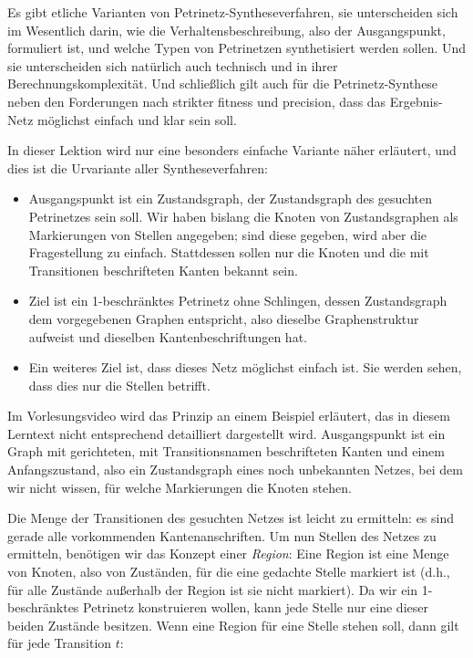 Es gibt etliche Varianten von Petrinetz-Syntheseverfahren, sie unterscheiden sich im Wesentlich darin, wie die Verhaltensbeschreibung, also der Ausgangspunkt, formuliert ist, und welche Typen von Petrinetzen synthetisiert werden sollen. Und sie unterscheiden sich natürlich auch technisch und in ihrer Berechnungskomplexität. Und schließlich gilt auch für die Petrinetz-Synthese neben den Forderungen nach strikter fitness und precision, dass das Ergebnis-Netz möglichst einfach und klar sein soll. 

In dieser Lektion wird nur eine besonders einfache Variante näher erläutert, und dies ist die Urvariante aller Syntheseverfahren: 

\vspace{2mm} %

\begin{itemize}
	\item Ausgangspunkt ist ein Zustandsgraph, der Zustandsgraph des gesuchten Petri\-netzes sein soll. Wir haben bislang die Knoten von Zustandsgraphen als Markierungen von Stellen angegeben; sind diese gegeben, wird aber die Fragestellung zu einfach. Stattdessen sollen nur die Knoten und die mit Transitionen beschrifteten Kanten bekannt sein.
	\item Ziel ist ein 1-beschränktes Petrinetz ohne Schlingen, dessen Zustandsgraph dem vorgegebenen Graphen entspricht, also dieselbe Graphenstruktur aufweist und dieselben Kantenbeschriftungen hat.
	\item Ein weiteres Ziel ist, dass dieses Netz möglichst einfach ist. Sie werden sehen, dass dies nur die Stellen betrifft.
\end{itemize}

\vspace{2mm} %

Im Vorlesungsvideo wird das Prinzip an einem Beispiel erläutert, das in diesem Lerntext nicht entsprechend detailliert dargestellt wird. Ausgangspunkt ist ein Graph mit gerichteten, mit Transitionsnamen beschrifteten Kanten und einem Anfangszustand, also ein Zustandsgraph eines noch unbekannten Netzes, bei dem wir nicht wissen, für welche Markierungen die Knoten stehen. 

Die Menge der Transitionen des gesuchten Netzes ist leicht zu ermitteln: es sind gerade alle vorkommenden Kantenanschriften. Um nun Stellen des Netzes zu ermitteln, benötigen wir das Konzept einer \emph{Region}:
Eine Region ist eine Menge von Knoten, also von Zuständen, für die eine gedachte Stelle markiert ist (d.h., für alle Zustände außerhalb der Region ist sie nicht markiert). Da wir ein 1-beschränktes Petrinetz konstruieren wollen, kann jede Stelle nur eine dieser beiden Zustände besitzen. Wenn eine Region für eine Stelle stehen soll, dann gilt für jede Transition $t$:

